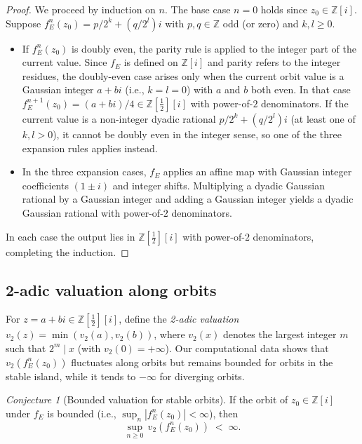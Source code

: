 \documentclass[12pt]{article}
\theoremstyle{plain}
\theoremstyle{definition}
\theoremstyle{remark}
\newtheorem{conjecture}[theorem]{Conjecture}
\theoremstyle{definition}
\newcommand{\Z}{\mathbb{Z}}
\newcommand{\Zi}{\mathbb{Z}[i]}
\newcommand{\norm}[1]{\left|#1\right|}
\newcommand{\vp}[1]{v_2(#1)}
\begin{document}
\begin{proof}
We proceed by induction on $n$.
The base case $n=0$ holds since $z_0 \in \Zi$.
Suppose $f_E^n(z_0) = p/2^k + (q/2^l)i$ with $p,q \in \Z$ odd
(or zero) and $k,l \geq 0$.
\begin{itemize}
    \item If $f_E^n(z_0)$ is doubly even, the parity rule is
          applied to the integer part of the current value.
          Since $f_E$ is defined on $\Zi$ and parity refers to
          the integer residues, the doubly-even case arises only
          when the current orbit value is a Gaussian integer
          $a + bi$ (i.e., $k = l = 0$) with $a$ and $b$ both even.
          In that case $f_E^{n+1}(z_0) = (a + bi)/4 \in
          \Z[\tfrac{1}{2}][i]$ with power-of-$2$ denominators.
          If the current value is a non-integer dyadic rational
          $p/2^k + (q/2^l)i$ (at least one of $k, l > 0$), it
          cannot be doubly even in the integer sense, so one of the
          three expansion rules applies instead.
    \item In the three expansion cases, $f_E$ applies an affine
          map with Gaussian integer coefficients $(1\pm i)$ and
          integer shifts. Multiplying a dyadic Gaussian rational
          by a Gaussian integer and adding a Gaussian integer
          yields a dyadic Gaussian rational with power-of-$2$
          denominators.
\end{itemize}
In each case the output lies in $\Z[\tfrac{1}{2}][i]$ with
power-of-$2$ denominators, completing the induction.
\end{proof}

\subsection{2-adic valuation along orbits}

For $z = a + bi \in \Z[\tfrac{1}{2}][i]$, define the
\emph{2-adic valuation} $\vp{z} = \min(\vp{a},\vp{b})$,
where $\vp{x}$ denotes the largest integer $m$ such that
$2^m \mid x$ (with $\vp{0} = +\infty$).
Our computational data shows that $\vp{f_E^n(z_0)}$ fluctuates
along orbits but remains bounded for orbits in the stable island,
while it tends to $-\infty$ for diverging orbits.

\begin{conjecture}[Bounded valuation for stable orbits]
\label{conj:valuation}
If the orbit of $z_0 \in \Zi$ under $f_E$ is bounded
(i.e., $\sup_n \norm{f_E^n(z_0)} < \infty$), then
\[
    \sup_{n \geq 0} \,\vp{f_E^n(z_0)} \;<\; \infty.
\]
\end{conjecture}
\end{document}
